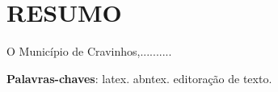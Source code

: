 %
 \chapter*{\hfill 
RESUMO \hfill}


O Município de Cravinhos,..........






\noindent
\textbf{Palavras-chaves}: latex. abntex. editoração de 
 texto.
\clearpage
\insertblankpage

%
